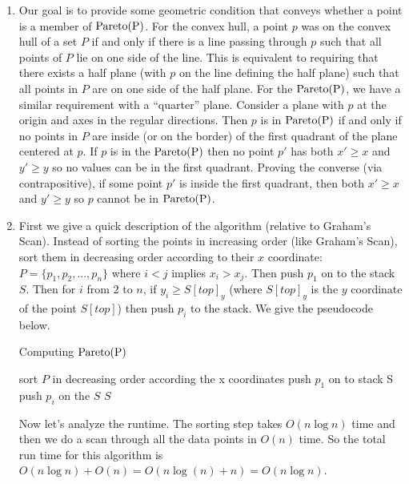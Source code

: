 \documentclass[11pt]{article}
\newcommand{\pareto}[1]{\rm{Pareto}(#1)}
\begin{document}
\answer
\begin{enumerate}
    \item Our goal is to provide some geometric condition that conveys whether a point is a member of $\pareto{P}$.
    For the convex hull, a point $p$ was on the convex hull of a set $P$ if and only if there is a line passing through $p$ such that all points of $P$ lie on one side of the line.
    This is equivalent to requiring that there exists a half plane (with $p$ on the line defining the half plane) such that all points in $P$ are on one side of the half plane.
    For the $\pareto{P}$, we have a similar requirement with a ``quarter'' plane.
    Consider a plane with $p$ at the origin and axes in the regular directions.
    Then $p$ is in $\pareto{P}$ if and only if no points in $P$ are inside (or on the border) of the first quadrant of the plane centered at $p$.
    If $p$ is in the $\pareto{P}$ then no point $p'$ has both $x' \geq x$ and $y' \geq y$ so no values can be in the first quadrant.
    Proving the converse (via contrapositive), if some point $p'$ is inside the first quadrant, then both $x' \geq x$ and $y' \geq y$ so $p$ cannot be in $\pareto{P}$.

    \item First we give a quick description of the algorithm (relative to Graham's Scan).
    Instead of sorting the points in increasing order (like Graham's Scan), sort them in decreasing order according to their $x$ coordinate: $P = \{ p_1, p_2, ..., p_n \}$ where $i < j$ implies $x_i > x_j$.
    Then push $p_1$ on to the stack $S$.
    Then for $i$ from $2$ to $n$, if $y_i \geq S[top]_y$ (where $S[top]_y$ is the $y$ coordinate of the point $S[top]$) then push $p_i$ to the stack.
    We give the pseudocode below.

    \begin{algorithm}
    \caption{Computing $\pareto{P}$}
    \label{alg:paretoscan}
        \begin{algorithmic}[1]
            \State sort $P$ in decreasing order according the x coordinates
            \State push $p_1$ on to stack S
                    \State push $p_i$ on the $S$
                \EndIf
            \EndFor
            \State \Return $S$
        \EndFunction
        \end{algorithmic}
    \end{algorithm}

    Now let's analyze the runtime.
    The sorting step takes $O(n \log n)$ time and then we do a scan through all the data points in $O(n)$ time.
    So the total run time for this algorithm is $O(n \log n) + O(n) = O(n \log (n) + n) = O(n \log n)$.


\end{enumerate}
\end{document}
